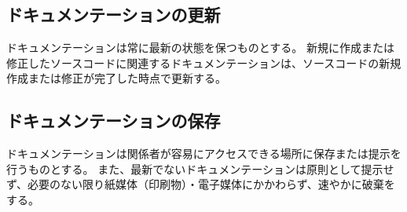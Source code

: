 \subsection{ドキュメンテーションの更新}
ドキュメンテーションは常に最新の状態を保つものとする。
新規に作成または修正したソースコードに関連するドキュメンテーションは、ソースコードの新規作成または修正が完了した時点で更新する。

\subsection{ドキュメンテーションの保存}
ドキュメンテーションは関係者が容易にアクセスできる場所に保存または提示を行うものとする。
また、最新でないドキュメンテーションは原則として提示せず、必要のない限り紙媒体（印刷物）・電子媒体にかかわらず、速やかに破棄をする。

